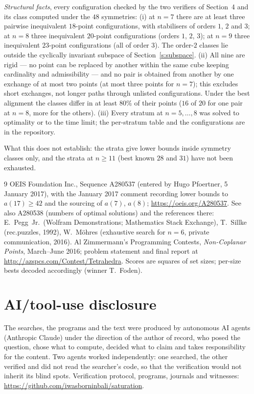 \documentclass[11pt,a4paper]{article}
\begin{document}
\emph{Structural facts}, every configuration checked by the two verifiers of Section~4 and its
class computed under the $48$ symmetries: (i) at $n=7$ there are at least three pairwise
inequivalent $18$-point configurations, with stabilisers of orders $1$, $2$ and $3$; at $n=8$
three inequivalent $20$-point configurations (orders $1$, $2$, $3$); at $n=9$ three inequivalent
$23$-point configurations (all of order $3$).  The order-$2$ classes lie outside the cyclically
invariant subspace of Section~\ref{s:subspace}.  (ii) All nine are rigid --- no point can be
replaced by another within the same cube keeping cardinality and admissibility --- and no pair is
obtained from another by one exchange of at most two points (at most three points for $n=7$); this
excludes short exchanges, not longer paths through unlisted configurations.  Under the best alignment the classes differ in at least $80\%$ of
their points ($16$ of $20$ for one pair at $n=8$, more for the others).  (iii) Every stratum at $n=5,\dots,8$ was solved to optimality or to the time limit;
the per-stratum table and the configurations are in the repository.

What this does not establish: the strata give lower bounds inside symmetry classes only, and the
strata at $n\ge11$ (best known $28$ and $31$) have not been exhausted.

\begin{thebibliography}{9}
 OEIS Foundation Inc., Sequence A280537 (entered by Hugo Pfoertner, 5 January 2017), with the
January 2017 comment recording lower bounds to $a(17)\ge42$ and the sourcing of $a(7)$, $a(8)$;
\url{https://oeis.org/A280537}.  See also A280538 (numbers of optimal solutions) and the
references there: E.~Pegg~Jr.\ (Wolfram Demonstrations; Mathematics Stack Exchange), T.~Sillke
(rec.puzzles, 1992), W.~M\"ohres (exhaustive search for $n=6$, private communication, 2016).
 Al Zimmermann's Programming Contests, \emph{Non-Coplanar Points}, March--June
2016; problem statement and final report at \url{http://azspcs.com/Contest/Tetrahedra}.  Scores
are squares of set sizes; per-size bests decoded accordingly (winner T.~Foden).
\end{thebibliography}

\section*{AI/tool-use disclosure}
The searches, the programs and the text were produced by autonomous AI agents (Anthropic Claude)
under the direction of the author of record, who posed the question, chose what to compute,
decided what to claim and takes responsibility for the content.  Two agents worked independently:
one searched, the other verified and did not read the searcher's code, so that the verification
would not inherit its blind spots.  Verification protocol, programs, journals and witnesses:
\url{https://github.com/iwasborninbali/saturation}.
\end{document}
